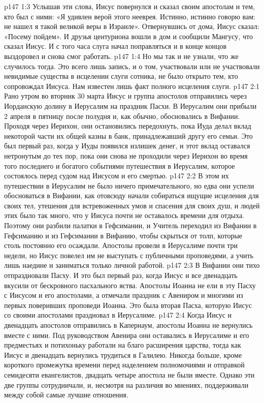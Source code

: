\vs p147 1:3 Услышав эти слова, Иисус повернулся и сказал своим апостолам и тем, кто был с ними: «Я удивлен верой этого нееврея. Истинно, истинно говорю вам: не нашел я такой великой веры в Израиле». Отвернувшись от дома, Иисус сказал: «Посему пойдем». И друзья центуриона вошли в дом и сообщили Мангусу, что сказал Иисус. И с того часа слуга начал поправляться и в конце концов выздоровел и снова смог работать.
\vs p147 1:4 Но мы так и не узнали, что же случилось тогда. Это всего лишь запись, и о том, участвовали или не участвовали невидимые существа в исцелении слуги сотника, не было открыто тем, кто сопровождал Иисуса. Нам известен лишь факт полного исцеления слуги.
\vs p147 2:1 Рано утром во вторник 30 марта Иисус и группа апостолов отправились через Иорданскую долину в Иерусалим на праздник Пасхи. В Иерусалим они прибыли 2 апреля в пятницу после полудня и, как обычно, обосновались в Вифании. Проходя через Иерихон, они остановились передохнуть, пока Иуда делал вклад некоторой части их общей казны в банк, принадлежавший другу его семьи. Это был первый раз, когда у Иуды появился излишек денег, и этот вклад оставался нетронутым до тех пор, пока они снова не проходили через Иерихон во время того последнего и богатого событиями путешествия в Иерусалим, которое состоялось перед судом над Иисусом и его смертью.
\vs p147 2:2 В этом их путешествии в Иерусалим не было ничего примечательного, но едва они успели обосноваться в Вифании, как отовсюду начали собираться ищущие исцеления для своих тел, утешения для встревоженных умов и спасения для своих душ, и людей этих было так много, что у Иисуса почти не оставалось времени для отдыха. Поэтому они разбили палатки в Гефсимании, и Учитель переходил из Вифании в Гефсиманию и из Гефсимании в Вифанию, чтобы скрыться от толп, которые столь постоянно его осаждали. Апостолы провели в Иерусалиме почти три недели, но Иисус повелел им не выступать с публичными проповедями, а учить лишь наедине и заниматься только личной работой.
\vs p147 2:3 В Вифании они тихо отпраздновали Пасху. И это был первый раз, когда Иисус и все двенадцать вкусили от бескровного пасхального яства. Апостолы Иоанна не ели в эту Пасху с Иисусом и его апостолами, а отмечали праздник с Авениром и многими из первых поверивших проповеди Иоанна. Это была вторая Пасха, которую Иисус со своими апостолами праздновал в Иерусалиме.
\vs p147 2:4 Когда Иисус и двенадцать апостолов отправились в Капернаум, апостолы Иоанна не вернулись вместе с ними. Под руководством Авенира они оставались в Иерусалиме и его предместьях и потихоньку работали на благо расширения царства, тогда как Иисус и двенадцать вернулись трудиться в Галилею. Никогда больше, кроме короткого промежутка времени перед наделением полномочиями и отправкой семидесяти евангелистов, двадцать четыре апостола не были вместе. Однако эти две группы сотрудничали, и, несмотря на различия во мнениях, поддерживали между собой самые лучшие отношения.
